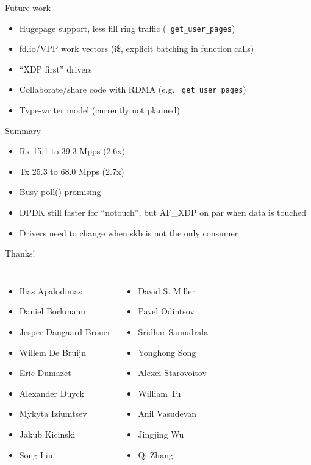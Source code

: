 \documentclass[aspectratio=169, xcolor=table]{beamer}
\begin{document}
  \begin{frame}{Future work}
    \begin{itemize}
    \item Hugepage support, less fill ring traffic ({\tt
      get\_user\_pages})
    \item fd.io/VPP work vectors (i\$, explicit batching in function calls)
    \item ``XDP first'' drivers 
    \item Collaborate/share code with RDMA (e.g. {\tt
      get\_user\_pages})
    \item Type-writer model (currently not planned)
    \end{itemize}
  \end{frame}

  \begin{frame}{Summary}
  \begin{itemize}
  \item Rx 15.1 to 39.3 Mpps (2.6x)
  \item Tx 25.3 to 68.0 Mpps (2.7x)
  \item Busy poll() promising
  \item DPDK still faster for ``notouch'', but AF\_XDP on par when data is touched
  \item Drivers need to change when skb is not the only consumer
  \end{itemize}
  \end{frame}

  \begin{frame}{Thanks!}
  \begin{columns}[T,onlytextwidth]
    \begin{itemize}
    \item Ilias Apalodimas
    \item Daniel Borkmann
    \item Jesper Dangaard Brouer
    \item Willem De Bruijn
    \item Eric Dumazet
    \item Alexander Duyck
    \item Mykyta Iziumtsev
    \item Jakub Kicinski
    \item Song Liu
    \end{itemize}
    
    \begin{itemize}
    \item David S. Miller
    \item Pavel Odintsov
    \item Sridhar Samudrala
    \item Yonghong Song
    \item Alexei Starovoitov
    \item William Tu
    \item Anil Vasudevan
    \item Jingjing Wu
    \item Qi Zhang
    \end{itemize}
  \end{columns}
  \end{frame}
\end{document}
